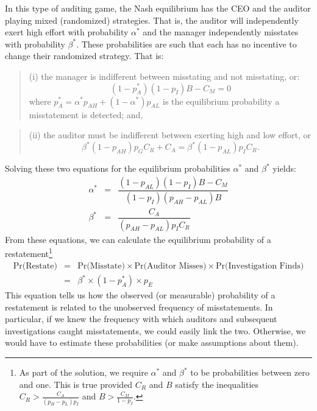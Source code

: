 In this type of auditing game, the Nash equilibrium has the CEO and the auditor playing mixed (randomized) strategies.
That is, the auditor will independently exert high effort with probability $\alpha^*$ and the manager independently misstates with probability $\beta^*$. 
These probabilities are such that each has no incentive to change their randomized strategy.  That is:
\begin{quote}
(i) the manager is indifferent between misstating and not misstating, or:
\begin{equation}\label{manager}
(1 - p_A^*)(1 - p_I) B - C_M = 0 
\end{equation}
where $p_A^* = \alpha^* p_{AH }+ (1-\alpha^*) p_{AL}$ is the equilibrium 
probability a misstatement is detected; and,
\end{quote}
\begin{quote} (ii) the auditor must be
indifferent between exerting high and low effort, or
$$ \beta^* (1-p_{AH}) p_G C_R + C_A = \beta^* (1-p_{AL}) p_I C_R .$$
\end{quote}

Solving these two equations for the equilibrium probabilities $\alpha^*$ and $\beta^*$
yields:
\begin{equation}\label{equilstrat}
\begin{array}{lcl}
  \alpha^* &= & \dfrac{ ( 1 - p_{AL}) (1 - p_I) B- C_M}{ (1 - p_I) (p_{AH}-p_{AL}) B}\\[1.5em]
  \beta^* &= & \dfrac{C_A}{(p_{AH}-p_{AL}) p_I C_R}  
\end{array}
\end{equation}
From these equations, we can calculate the equilibrium probability of a restatement\footnote{
As part of the solution, we require $\alpha^*$ and $\beta^*$ to be probabilities between
zero and one. 
This is true provided $C_R$ and $B$ satisfy the inequalities
$ C_R > \frac{C_A}{(p_H-p_L)p_I} $
and 
$ B > \frac{C_M}{1 - p_I}  $.}
\begin{equation} \label{equilpr1}
\begin{array}{lcl}
\mbox{Pr(Restate)} & = &  \mbox{Pr(Misstate)} \times \mbox{Pr(Auditor Misses)} \times
\mbox{Pr(Investigation Finds)}\\[1em]
& = & \beta^* \times (1-p_A^*) \times p_{E}
\end{array}\end{equation}
This equation tells us how the observed (or measurable) probability of a restatement is related to
the unobserved frequency of misstatements. In particular, if we knew the frequency with which auditors and subsequent investigations caught misstatements, we could easily link the two. Otherwise,
we would have to estimate these probabilities (or make assumptions about them).

